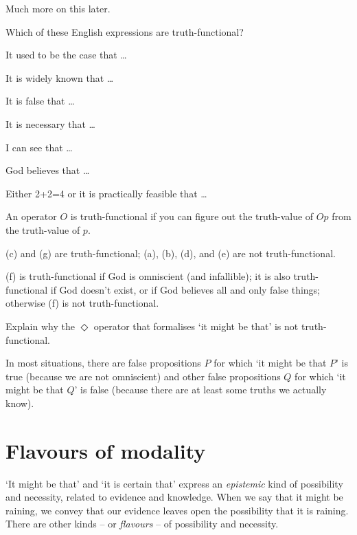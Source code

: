 Much more on this later. 

\begin{exercise}\label{ex:truth-func}
  Which of these English expressions are truth-functional?
  \begin{exlist}
  \item It used to be the case that \ldots
  \item It is widely known that \ldots
  \item It is false that \ldots
  \item It is necessary that \ldots
  \item I can see that \ldots
  \item God believes that \ldots
  \item Either 2+2=4 or it is practically feasible that \ldots
  \end{exlist}
\end{exercise}
\begin{solution}
  An operator $O$ is truth-functional if you can figure out the
  truth-value of $Op$ from the truth-value of $p$.

  (c) and (g) are truth-functional; (a), (b), (d), and (e) are not
  truth-functional.

  (f) is truth-functional if God is omniscient (and infallible); it is also
  truth-functional if God doesn't exist, or if God believes all and only false
  things; otherwise (f) is not truth-functional.
\end{solution}

\begin{exercise}\label{ex:might-truth-func}
  Explain why the $\Diamond$ operator that formalises `it might be that' is not truth-functional.
\end{exercise}
\begin{solution}
  In most situations, there are false propositions $P$ for which `it might be
  that $P$' is true (because we are not omniscient) and other false propositions
  $Q$ for which `it might be that $Q$' is false (because there are at least some truths we actually know).
\end{solution}

\section{Flavours of modality}
\label{sec:flavours}

`It might be that' and `it is certain that' express an \emph{epistemic} kind of
possibility and necessity, related to evidence and knowledge. When we say that
it might be raining, we convey that our evidence leaves open the possibility
that it is raining. There are other kinds -- or \emph{flavours} -- of
possibility and necessity.

